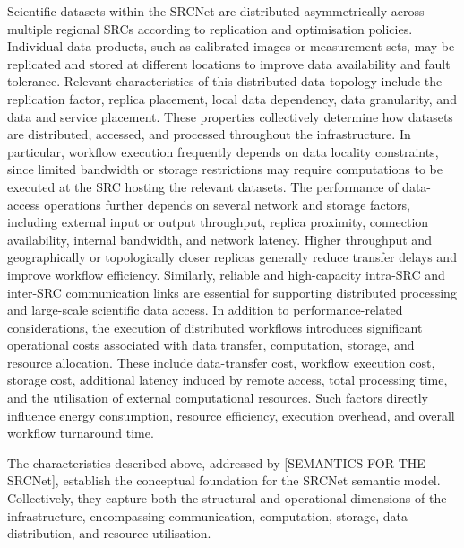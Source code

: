 \documentclass[a4paper,fleqn]{cas-dc}
\begin{document}
Scientific datasets within the SRCNet are distributed asymmetrically across multiple regional SRCs according to replication and optimisation policies. Individual data products, such as calibrated images or measurement sets, may be replicated and stored at different locations to improve data availability and fault tolerance. Relevant characteristics of this distributed data topology include the replication factor, replica placement, local data dependency, data granularity, and data and service placement. These properties collectively determine how datasets are distributed, accessed, and processed throughout the infrastructure. In particular, workflow execution frequently depends on data locality constraints, since limited bandwidth or storage restrictions may require computations to be executed at the SRC hosting the relevant datasets. The performance of data-access operations further depends on several network and storage factors, including external input or output throughput, replica proximity, connection availability, internal bandwidth, and network latency. Higher throughput and geographically or topologically closer replicas generally reduce transfer delays and improve workflow efficiency. Similarly, reliable and high-capacity intra-SRC and inter-SRC communication links are essential for supporting distributed processing and large-scale scientific data access. In addition to performance-related considerations, the execution of distributed workflows introduces significant operational costs associated with data transfer, computation, storage, and resource allocation. These include data-transfer cost, workflow execution cost, storage cost, additional latency induced by remote access, total processing time, and the utilisation of external computational resources. Such factors directly influence energy consumption, resource efficiency, execution overhead, and overall workflow turnaround time. 

The characteristics described above, addressed by [SEMANTICS FOR THE SRCNet], establish the conceptual foundation for the SRCNet semantic model. Collectively, they capture both the structural and operational dimensions of the infrastructure, encompassing communication, computation, storage, data distribution, and resource utilisation. 
\end{document}
